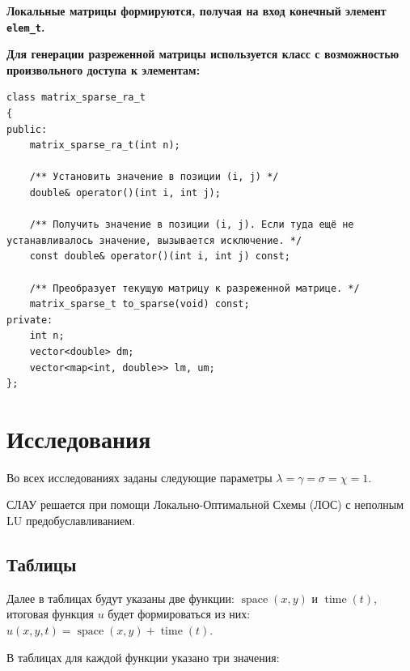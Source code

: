 \noindent\textbf{Локальные матрицы формируются, получая на вход конечный элемент \texttt{elem\_t}.}

\noindent\textbf{Для генерации разреженной матрицы используется класс с возможностью произвольного доступа к элементам:}

\begin{tcolorbox}[
	colback=white,
	colframe=black!30!white,
	boxrule=0.5pt, 
	listing only,
	left=-0.5mm,
	leftrule=4mm,
	arc=2mm, outer arc=2mm,
	top=0pt,
	bottom=0pt,
	enhanced jigsaw,
	coltitle=black, 
	fonttitle=\bfseries\ttfamily,
	break at=-\baselineskip/0pt/\textheight, 
]
\begin{verbatim}
class matrix_sparse_ra_t
{
public:
    matrix_sparse_ra_t(int n);

    /** Установить значение в позиции (i, j) */
    double& operator()(int i, int j);

    /** Получить значение в позиции (i, j). Если туда ещё не устанавливалось значение, вызывается исключение. */
    const double& operator()(int i, int j) const;

    /** Преобразует текущую матрицу к разреженной матрице. */
    matrix_sparse_t to_sparse(void) const;
private:
    int n;
    vector<double> dm;
    vector<map<int, double>> lm, um;
};
\end{verbatim}
\end{tcolorbox} 


\section{Исследования}

Во всех исследованиях заданы следующие параметры $ \lambda = \gamma = \sigma = \chi = 1$.

СЛАУ решается при помощи Локально-Оптимальной Схемы (ЛОС) с неполным LU предобуславливанием.

\subsection{Таблицы}

Далее в таблицах будут указаны две функции: $\operatorname{space}(x, y)$ и $\operatorname{time}(t)$, итоговая функция $u$ будет формироваться из них: $u(x, y, t) = \operatorname{space}(x, y) + \operatorname{time}(t) $.

В таблицах для каждой функции указано три значения: 

